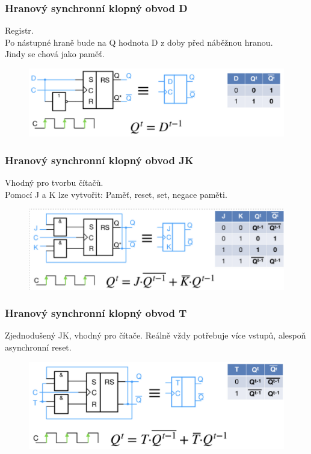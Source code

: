 \subsubsection{Hranový synchronní klopný obvod D}
Registr. \\
Po nástupné hraně bude na Q hodnota D z doby před náběžnou hranou. \\
Jindy se chová jako paměť.\\
\begin{figure}[h!]
    \centering
    \includegraphics*[scale = 0.5]{img/DHran.png}
\end{figure}

\subsubsection{Hranový synchronní klopný obvod JK}
Vhodný pro tvorbu čítačů.\\
Pomocí J a K lze vytvořit: Paměť, reset, set, negace paměti.\\
\begin{figure}[h!]
    \centering
    \includegraphics[scale = 0.5]{img/JK.png}
\end{figure}

\subsubsection{Hranový synchronní klopný obvod T}
Zjednodušený JK, vhodný pro čítače. Reálně vždy potřebuje více vstupů, alespoň asynchronní reset. \\
\begin{figure}[h!]
    \centering
    \includegraphics[scale = 0.3]{img/T.png}
\end{figure}

